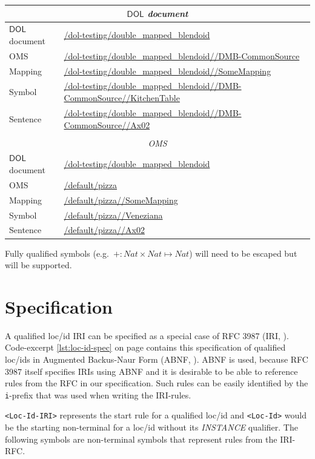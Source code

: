 \documentclass[10pt,fleqn,final]{scrreprt}
\newcommand{\cbs}[0]{\color{red}\xspace} %
\newcommand{\cbe}[0]{\color{black}\xspace} %
\newcommand*{\DOL}{\ensuremath{\mathsf{DOL}}\xspace}
\begin{document}
\begin{tabularx}{\textwidth}{p{}p{}}
  \multicolumn{2}{c}{\emph{\DOL document}} \\
  \hline
  \DOL document & \url{/dol-testing/double_mapped_blendoid}\\
  OMS & \url{/dol-testing/double_mapped_blendoid//DMB-CommonSource}\\
  Mapping & \url{/dol-testing/double_mapped_blendoid//SomeMapping}\\
  Symbol & \url{/dol-testing/double_mapped_blendoid//DMB-CommonSource//KitchenTable}\\
  Sentence & \url{/dol-testing/double_mapped_blendoid//DMB-CommonSource//Ax02}\\
  & \\
  \multicolumn{2}{c}{\emph{OMS}} \\
  \hline
  \DOL document & \url{/dol-testing/double_mapped_blendoid}\\
  OMS & \url{/default/pizza}\\
  Mapping & \url{/default/pizza//SomeMapping}\\
  Symbol & \url{/default/pizza//Veneziana}\\
  Sentence & \url{/default/pizza//Ax02}\\
\end{tabularx}

Fully qualified symbols (e.g.\ $+:Nat \times Nat\mapsto Nat$) will need to be escaped
but will be supported.

\section{Specification}

\cbs A qualified loc/id IRI can be specified\cbe as a special case of RFC 3987 (IRI,
\cite{rfc3987}). Code-excerpt \ref{lst:loc-id-spec} on page
\pageref{lst:loc-id-spec} contains this specification of qualified loc/ids in
Augmented Backus-Naur Form (ABNF, \cite{rfc5234}).\cbs ABNF is used,\cbe because
RFC 3987 itself specifies IRIs using ABNF and\cbs it is desirable to\cbe be able to reference
rules from the RFC in our specification. Such rules can be easily identified by
the \texttt{i}-prefix that was used when writing the IRI-rules.

\texttt{<Loc-Id-IRI>} represents the start rule for a qualified loc/id and
\texttt{<Loc-Id>} would be the starting non-terminal for a loc/id without its
\emph{INSTANCE} qualifier. The following symbols are non-terminal symbols that
represent rules from the IRI-RFC.
\end{document}
